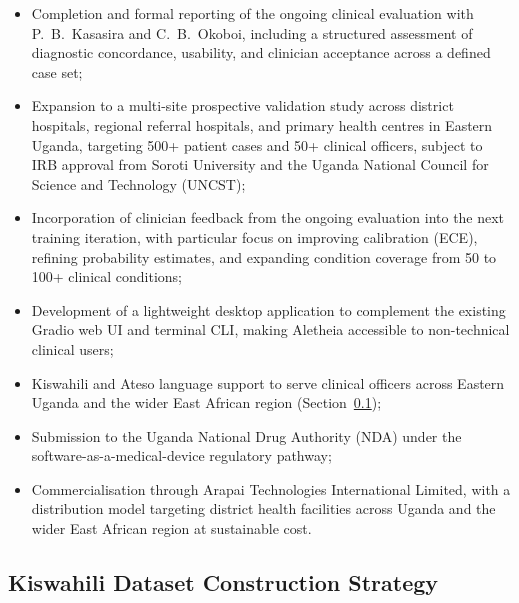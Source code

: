 \documentclass[journal]{IEEEtran}
\begin{document}
\begin{itemize}
  \item Completion and formal reporting of the ongoing clinical
        evaluation with P.~B.~Kasasira and C.~B.~Okoboi, including
        a structured assessment of diagnostic concordance, usability,
        and clinician acceptance across a defined case set;

  \item Expansion to a multi-site prospective validation study
        across district hospitals, regional referral hospitals, and
        primary health centres in Eastern Uganda, targeting 500+
        patient cases and 50+ clinical officers, subject to IRB
        approval from Soroti University and the Uganda National
        Council for Science and Technology (UNCST);

  \item Incorporation of clinician feedback from the ongoing
        evaluation into the next training iteration, with particular
        focus on improving calibration (ECE), refining probability
        estimates, and expanding condition coverage from 50 to
        100+ clinical conditions;

  \item Development of a lightweight desktop application to
        complement the existing Gradio web UI and terminal CLI,
        making Aletheia accessible to non-technical clinical users;

  \item Kiswahili and Ateso language support to serve clinical
        officers across Eastern Uganda and the wider East African
        region (Section~\ref{sec:kiswahili_dataset});

  \item Submission to the Uganda National Drug Authority (NDA)
        under the software-as-a-medical-device regulatory pathway;

  \item Commercialisation through Arapai Technologies International Limited, with a distribution model targeting district
        health facilities across Uganda and the wider East African
        region at sustainable cost.
\end{itemize}

\subsection{Kiswahili Dataset Construction Strategy}
\label{sec:kiswahili_dataset}
\end{document}
